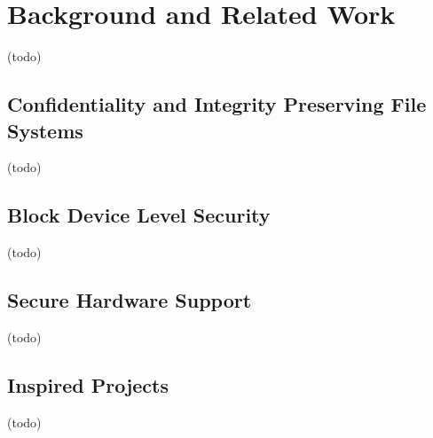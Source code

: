 \chapter{Background and Related Work} \label{chp:related}

(todo)

\section{Confidentiality and Integrity Preserving File Systems}

(todo)

\section{Block Device Level Security}

(todo)

\section{Secure Hardware Support}

(todo)

\section{Inspired Projects}

(todo)

